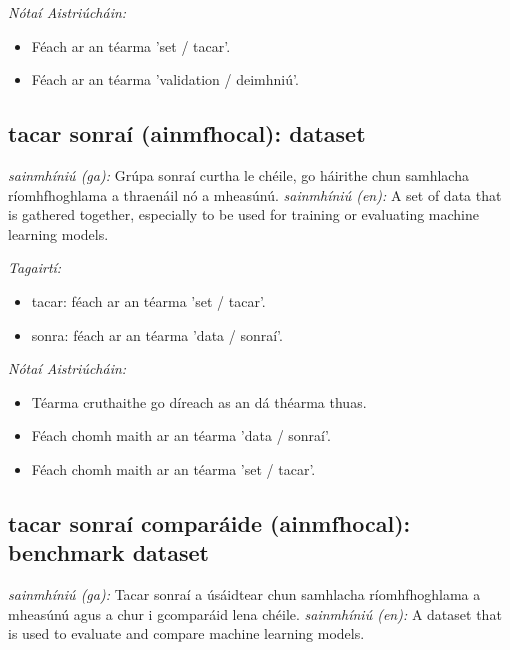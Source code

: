 \documentclass{article}
\begin{document}
 \noindent \textit{Nótaí Aistriúcháin:}
\begin{itemize}
	\item Féach ar an téarma 'set / tacar'.
	\item Féach ar an téarma 'validation / deimhniú'.
\end{itemize}


\subsection*{tacar sonraí (ainmfhocal): dataset} 
 \noindent \textit{sainmhíniú (ga):} Grúpa sonraí curtha le chéile, go háirithe chun samhlacha ríomhfhoghlama a thraenáil nó a mheasúnú.
\newline\newline
 \noindent \textit{sainmhíniú (en):} A set of data that is gathered together, especially to be used for training or evaluating machine learning models.
\newline

 \noindent \textit{Tagairtí:}
\begin{itemize}
	\item tacar: féach ar an téarma 'set / tacar'.
	\item sonra: féach ar an téarma 'data / sonraí'.
\end{itemize}

 \noindent \textit{Nótaí Aistriúcháin:}
\begin{itemize}
	\item Téarma cruthaithe go díreach as an dá théarma thuas.
	\item Féach chomh maith ar an téarma 'data / sonraí'.
	\item Féach chomh maith ar an téarma 'set / tacar'.
\end{itemize}


\subsection*{tacar sonraí comparáide (ainmfhocal): benchmark dataset} 
 \noindent \textit{sainmhíniú (ga):} Tacar sonraí a úsáidtear chun samhlacha ríomhfhoghlama a mheasúnú agus a chur i gcomparáid lena chéile.
\newline\newline
 \noindent \textit{sainmhíniú (en):} A dataset that is used to evaluate and compare machine learning models.
\newline
\end{document}
